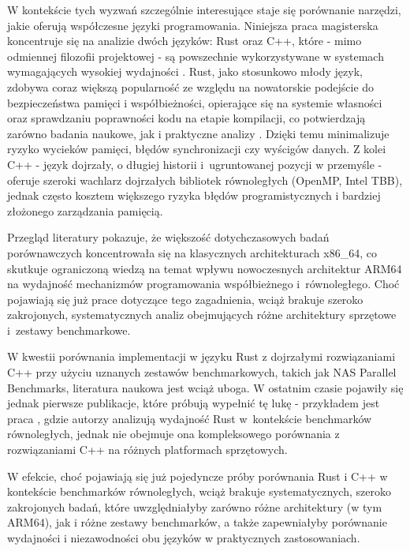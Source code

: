 W kontekście tych wyzwań szczególnie interesujące staje się porównanie narzędzi, jakie oferują współczesne języki programowania. Niniejsza praca magisterska koncentruje się na analizie dwóch języków: Rust oraz C++, które - mimo odmiennej filozofii projektowej - są powszechnie wykorzystywane w systemach wymagających wysokiej wydajności \cite{Hazarika2025RustVsCpp}. Rust, jako stosunkowo młody język, zdobywa coraz większą popularność ze względu na nowatorskie podejście do bezpieczeństwa pamięci i współbieżności, opierające się na systemie własności  oraz sprawdzaniu poprawności kodu na etapie kompilacji, co potwierdzają zarówno badania naukowe, jak i praktyczne analizy \cite{Saligrama2019RustConcurrency,RustFC}. Dzięki temu minimalizuje ryzyko wycieków pamięci, błędów synchronizacji czy wyścigów danych. Z kolei C++ - język dojrzały, o długiej historii i~ugruntowanej pozycji w przemyśle - oferuje szeroki wachlarz dojrzałych bibliotek równoległych (OpenMP, Intel TBB), jednak często kosztem większego ryzyka błędów programistycznych i bardziej złożonego zarządzania pamięcią.

Przegląd literatury pokazuje, że większość dotychczasowych badań porównawczych koncentrowała się na klasycznych architekturach x86\_64, co skutkuje ograniczoną wiedzą na temat wpływu nowoczesnych architektur ARM64 na wydajność mechanizmów programowania współbieżnego i~równoległego. Choć pojawiają się już prace dotyczące tego zagadnienia, wciąż brakuje szeroko zakrojonych, systematycznych analiz obejmujących różne architektury sprzętowe i~zestawy benchmarkowe.

W kwestii porównania implementacji w języku Rust z dojrzałymi rozwiązaniami C++ przy użyciu uznanych zestawów benchmarkowych, takich jak NAS Parallel Benchmarks, literatura naukowa jest wciąż uboga. W ostatnim czasie pojawiły się jednak pierwsze publikacje, które próbują wypełnić tę lukę - przykładem jest praca \cite{martins2025npbrustnasparallelbenchmarks}, gdzie autorzy analizują wydajność Rust w~kontekście benchmarków równoległych, jednak nie obejmuje ona kompleksowego porównania z rozwiązaniami C++ na różnych platformach sprzętowych.

W efekcie, choć pojawiają się już pojedyncze próby porównania Rust i C++ w kontekście benchmarków równoległych, wciąż brakuje systematycznych, szeroko zakrojonych badań, które uwzględniałyby zarówno różne architektury (w tym ARM64), jak i różne zestawy benchmarków, a także zapewniałyby porównanie wydajności i niezawodności obu języków w praktycznych zastosowaniach.


